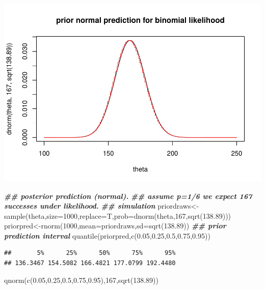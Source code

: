 \documentclass[
]{book}
\newenvironment{Shaded}{\begin{snugshade}}{\end{snugshade}}
\newcommand{\AttributeTok}[1]{\textcolor[rgb]{0.77,0.63,0.00}{#1}}
\newcommand{\DecValTok}[1]{\textcolor[rgb]{0.00,0.00,0.81}{#1}}
\newcommand{\DocumentationTok}[1]{\textcolor[rgb]{0.56,0.35,0.01}{\textbf{\textit{#1}}}}
\newcommand{\FloatTok}[1]{\textcolor[rgb]{0.00,0.00,0.81}{#1}}
\newcommand{\FunctionTok}[1]{\textcolor[rgb]{0.00,0.00,0.00}{#1}}
\newcommand{\NormalTok}[1]{#1}
\newcommand{\OtherTok}[1]{\textcolor[rgb]{0.56,0.35,0.01}{#1}}
\theoremstyle{definition}
\theoremstyle{definition}
\theoremstyle{definition}
\theoremstyle{definition}
\theoremstyle{remark}
\begin{document}
\includegraphics{_main_files/figure-latex/unnamed-chunk-13-1.pdf}

\begin{Shaded}
\begin{Highlighting}[]
  \DocumentationTok{\#\# posterior prediction (normal).}
     \DocumentationTok{\#\# assume p=1/6 we expect 167 successes under likelihood.}
\DocumentationTok{\#\# simulation     }
\NormalTok{     priordraws}\OtherTok{\textless{}{-}}\FunctionTok{sample}\NormalTok{(theta,}\AttributeTok{size=}\DecValTok{1000}\NormalTok{,}\AttributeTok{replace=}\NormalTok{T,}\AttributeTok{prob=}\FunctionTok{dnorm}\NormalTok{(theta,}\DecValTok{167}\NormalTok{,}\FunctionTok{sqrt}\NormalTok{(}\FloatTok{138.89}\NormalTok{)))}
\NormalTok{     priorpred}\OtherTok{\textless{}{-}}\FunctionTok{rnorm}\NormalTok{(}\DecValTok{1000}\NormalTok{,}\AttributeTok{mean=}\NormalTok{priordraws,}\AttributeTok{sd=}\FunctionTok{sqrt}\NormalTok{(}\FloatTok{138.89}\NormalTok{))}
     \DocumentationTok{\#\# prior prediction interval}
     \FunctionTok{quantile}\NormalTok{(priorpred,}\FunctionTok{c}\NormalTok{(}\FloatTok{0.05}\NormalTok{,}\FloatTok{0.25}\NormalTok{,}\FloatTok{0.5}\NormalTok{,}\FloatTok{0.75}\NormalTok{,}\FloatTok{0.95}\NormalTok{))}
\end{Highlighting}
\end{Shaded}

\begin{verbatim}
##       5%      25%      50%      75%      95% 
## 136.3467 154.5082 166.4821 177.0799 192.4480
\end{verbatim}

\begin{Shaded}
\begin{Highlighting}[]
     \FunctionTok{qnorm}\NormalTok{(}\FunctionTok{c}\NormalTok{(}\FloatTok{0.05}\NormalTok{,}\FloatTok{0.25}\NormalTok{,}\FloatTok{0.5}\NormalTok{,}\FloatTok{0.75}\NormalTok{,}\FloatTok{0.95}\NormalTok{),}\DecValTok{167}\NormalTok{,}\FunctionTok{sqrt}\NormalTok{(}\FloatTok{138.89}\NormalTok{))}
\end{Highlighting}
\end{Shaded}
\end{document}
